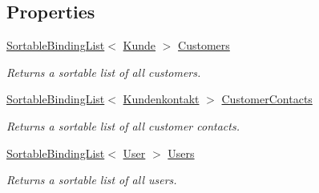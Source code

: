 \subsection*{Properties}
\begin{DoxyCompactItemize}
\item 
\hyperlink{class_products_1_1_common_1_1_sortable_binding_list}{Sortable\+Binding\+List}$<$ \hyperlink{class_products_1_1_model_1_1_entities_1_1_kunde}{Kunde} $>$ \hyperlink{class_products_1_1_model_1_1_model_service_a6bc595a6db4806b4dc3f37437204ab3b}{Customers}
\begin{DoxyCompactList}\small\item\em Returns a sortable list of all customers. \end{DoxyCompactList}\item 
\hyperlink{class_products_1_1_common_1_1_sortable_binding_list}{Sortable\+Binding\+List}$<$ \hyperlink{class_products_1_1_model_1_1_entities_1_1_kundenkontakt}{Kundenkontakt} $>$ \hyperlink{class_products_1_1_model_1_1_model_service_acb1111cbb862c9e2587105bb089cffd3}{Customer\+Contacts}
\begin{DoxyCompactList}\small\item\em Returns a sortable list of all customer contacts. \end{DoxyCompactList}\item 
\hyperlink{class_products_1_1_common_1_1_sortable_binding_list}{Sortable\+Binding\+List}$<$ \hyperlink{class_products_1_1_model_1_1_entities_1_1_user}{User} $>$ \hyperlink{class_products_1_1_model_1_1_model_service_add1e4b44389974fbc5bfbf77f65d502f}{Users}
\begin{DoxyCompactList}\small\item\em Returns a sortable list of all users. \end{DoxyCompactList}\end{DoxyCompactItemize}
